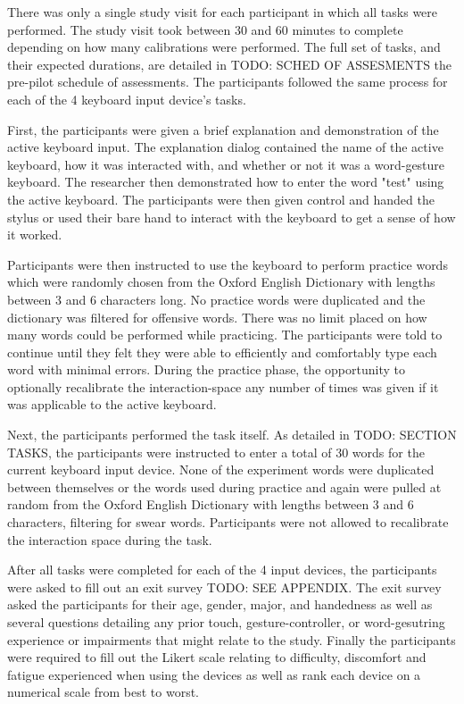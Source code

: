 There was only a single study visit for each participant in which all tasks were performed. The study visit took between 30 and 60 minutes to complete depending on how many calibrations were performed. The full set of tasks, and their expected durations, are detailed in TODO: SCHED OF ASSESMENTS the pre-pilot schedule of assessments. The participants followed the same process for each of the 4 keyboard input device's tasks.

First, the participants were given a brief explanation and demonstration of the active keyboard input. The explanation dialog contained the name of the active keyboard, how it was interacted with, and whether or not it was a word-gesture keyboard. The researcher then demonstrated how to enter the word "test" using the active keyboard. The participants were then given control and handed the stylus or used their bare hand to interact with the keyboard to get a sense of how it worked.

Participants were then instructed to use the keyboard to perform practice words which were randomly chosen from the Oxford English Dictionary with lengths between 3 and 6 characters long. No practice words were duplicated and the dictionary was filtered for offensive words. There was no limit placed on how many words could be performed while practicing. The participants were told to continue until they felt they were able to efficiently and comfortably type each word with minimal errors. During the practice phase, the opportunity to optionally recalibrate the interaction-space any number of times was given if it was applicable to the active keyboard.

Next, the participants performed the task itself. As detailed in TODO: SECTION TASKS, the participants were instructed to enter a total of 30 words for the current keyboard input device. None of the experiment words were duplicated between themselves or the words used during practice and again were pulled at random from the Oxford English Dictionary with lengths between 3 and 6 characters, filtering for swear words. Participants were not allowed to recalibrate the interaction space during the task. 

After all tasks were completed for each of the 4 input devices, the participants were asked to fill out an exit survey TODO: SEE APPENDIX. The exit survey asked the participants for their age, gender, major, and handedness as well as several questions detailing any prior touch, gesture-controller, or word-gesutring experience or impairments that might relate to the study. Finally the participants were required to fill out the Likert scale relating to difficulty, discomfort and fatigue experienced when using the devices as well as rank each device on a numerical scale from best to worst.

